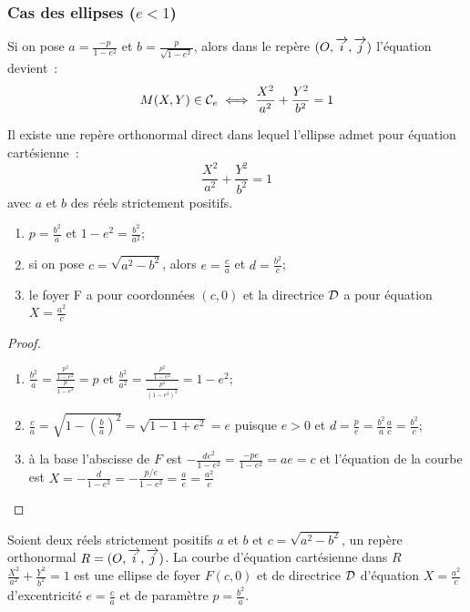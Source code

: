 \subsubsection{Cas des ellipses (\(e<1\))}
Si on pose \(a = \frac{-p}{1-e^2}\) et \(b = \frac{p}{\sqrt{1-e^2}}\), alors dans le 
repère \((O,\overrightarrow{i},\overrightarrow{j})\) l'équation devient~:
\begin{equation}
  M(X, Y) \in \mathcal{C}_{e} \iff \frac{X^2}{a^2} + \frac{Y^2}{b^2} = 1
\end{equation}
\begin{theo}
  Il existe une repère orthonormal direct dans lequel l'ellipse admet pour 
  équation cartésienne~:
  \begin{equation}
    \frac{X^2}{a^2} + \frac{Y^2}{b^2} = 1
  \end{equation}
  avec \(a\) et \(b\) des réels strictement positifs.
\end{theo}
\begin{prop}
  \begin{enumerate}
    \item \(p = \frac{b^2}{a}\) et \(1-e^2 = \frac{b^2}{a^2}\);
    \item si on pose \(c = \sqrt{a^2-b^2}\), alors \(e = \frac{c}{a}\) et 
      \(d = \frac{b^2}{c}\);
    \item le foyer F a pour coordonnées \((c, 0)\) et la directrice \(\mathcal{D}\) a 
      pour équation \(X = \frac{a^2}{c}\)
  \end{enumerate}
\end{prop}
\begin{proof}
  \begin{enumerate}
    \item \(\frac{b^2}{a} = \frac{\frac{p^2}{1-e^2}}{\frac{p}{1-e^2}} = p\) et 
      \(\frac{b^2}{a^2} = \frac{\frac{p^2}{1-e^2}}{\frac{p^2}{(1-e^2)^2}} = 1-e^2\);
    \item \(\frac{c}{a} = \sqrt{1-\left(\frac{b}{a}\right)^2} = \sqrt{1-1 + e^2} = e\) 
      puisque \(e>0\) et \(d = \frac{p}{e} = \frac{b^2}{a} 
      \frac{a}{c} = \frac{b^2}{c}\);
    \item à la base l'abscisse de \(F\) est 
      \(-\frac{de^2}{1-e^2} = \frac{-pe}{1-e^2} = ae = c\) et l'équation de la courbe 
      est \(X = -\frac{d}{1-e^2} = -\frac{p/e}{1-e^2} = \frac{a}{e} = \frac{a^2}{c}\)
  \end{enumerate}
\end{proof}
\begin{theo}
  Soient deux réels strictement positifs \(a\) et \(b\) et \(c = \sqrt{a^2-b^2}\), 
  un repère orthonormal \(R = (O,\overrightarrow{i},\overrightarrow{j})\). La courbe d'équation cartésienne dans \(R\) 
  \(\frac{X^2}{a^2} + \frac{Y^2}{b^2} = 1\) est une ellipse de foyer \(F(c, 0)\) et 
  de directrice \(\mathcal{D}\) d'équation \(X = \frac{a^2}{c}\) d'excentricité 
  \(e = \frac{c}{a}\) et de paramètre \(p = \frac{b^2}{a}\).
\end{theo}
